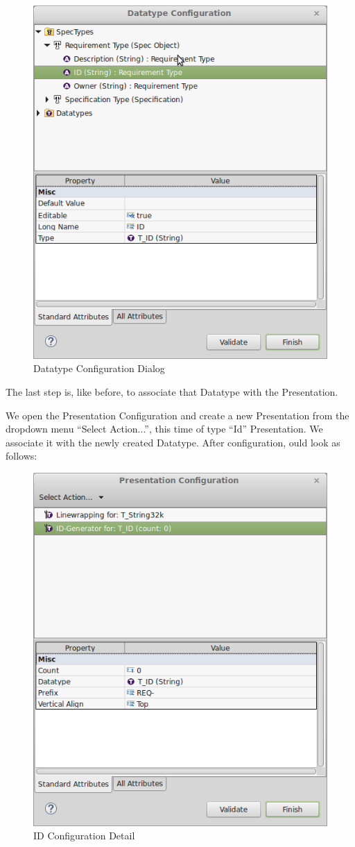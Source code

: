 \begin{figure}[H]
\centering      
\includegraphics[width=0.8\linewidth]{../rmf-images/t_id.png}      
\caption{Datatype Configuration Dialog}      
\label{fig:datatypeConfig}
\end{figure}

The last step is, like before, to associate that Datatype with the Presentation.

We open the Presentation Configuration and create a new Presentation from the dropdown menu ``Select Action...'', this time of type ``Id'' Presentation.  We associate it with the newly created Datatype.  After configuration, ould look as follows:

\begin{figure}[H]
\centering      
\includegraphics[width=0.8\linewidth]{../rmf-images/presentation_id.png}      
\caption{ID Configuration Detail}      
\label{fig:idConfig}
\end{figure}

